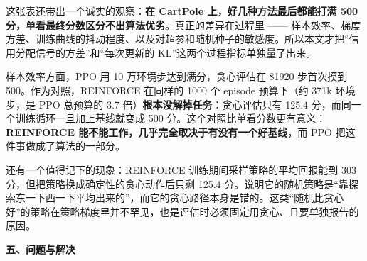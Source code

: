 \documentclass[11pt,a4paper]{ctexart}
\newcommand{\hOne}[1]{\par\vspace{0.5em}%
  {\color{hdark}\Large\bfseries #1}\par\vspace{0.1em}%
  \noindent{\color{hdark}\rule{\linewidth}{0.9pt}}\par\vspace{0.35em}}
\newcommand{\hTwo}[1]{\par\vspace{0.8em}{\color{hmid}\large\bfseries #1}\par\vspace{0.25em}}
\begin{document}
这张表还带出一个诚实的观察：\textbf{在 CartPole 上，好几种方法最后都能打满 500 分，单看最终分数区分不出算法优劣}。真正的差异在过程里 —— 样本效率、梯度方差、训练曲线的抖动程度、以及对超参和随机种子的敏感度。所以本文才把“信用分配信号的方差”和“每次更新的 KL”这两个过程指标单独量了出来。\par

样本效率方面，PPO 用 10 万环境步达到满分，贪心评估在 81920 步首次摸到 500。作为对照，REINFORCE 在同样的 1000 个 episode 预算下（约 371k 环境步，是 PPO 总预算的 3.7 倍）\textbf{根本没解掉任务}：贪心评估只有 125.4 分，而同一个训练循环一旦加上基线就变成 500 分。这个对照比单看分数更有意义：\textbf{REINFORCE 能不能工作，几乎完全取决于有没有一个好基线}，而 PPO 把这件事做成了算法的一部分。\par

还有一个值得记下的现象：REINFORCE 训练期间采样策略的平均回报能到 303 分，但把策略换成确定性的贪心动作后只剩 125.4 分。说明它的随机策略是“靠探索东一下西一下平均出来的”，而它的贪心路径本身是错的。这类“随机比贪心好”的策略在策略梯度里并不罕见，也是评估时必须固定用贪心、且要单独报告的原因。\par

\clearpage

\hOne{五、问题与解决}

\hTwo{5.1 实现层面踩过的坑}
\end{document}
